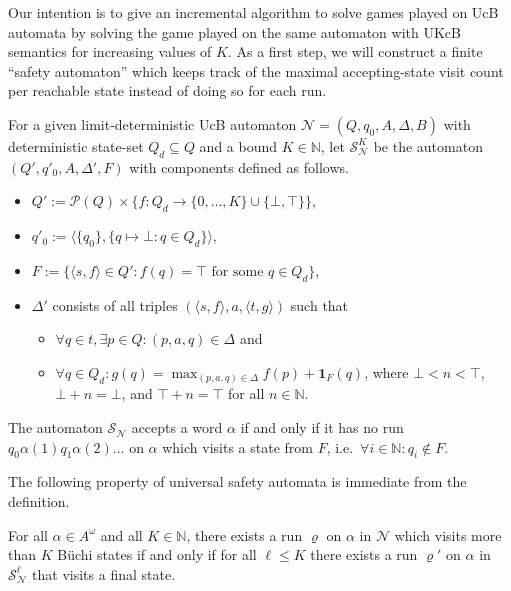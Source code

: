 \documentclass[runningheads,a4paper,draft]{llncs}
\let\rho\varrho
\newcommand{\indicator}[2]{\mathbf{1}_{#1}(#2)}
\newcommand{\pow}{\mathcal{P}}
\newcommand{\st}{\mathrel{:}}
\newcommand{\ie}{i.e.\xspace}
\newcommand{\calN}{\mathcal{N}}
\newcommand{\calS}{\mathcal{S}}
\begin{document}
Our intention is to give an incremental algorithm to solve games played on UcB
automata by solving the game played on the same automaton with UKcB semantics
for increasing values of $K$. As a first step, we will construct a finite
``safety automaton'' which keeps track of the maximal accepting-state visit
count per reachable state instead of doing so for each run.
\begin{definition}
    For a given limit-deterministic UcB automaton $\calN = (Q,q_0,A,\Delta,B)$
    with deterministic state-set $Q_d \subseteq Q$ and a bound $K \in
    \mathbb{N}$, let $\calS^K_\calN$ be the automaton $(Q',q'_0,A,\Delta',F)$ with
    components defined as follows.
    \begin{itemize}
        \item $Q' := \pow(Q) \times \{f : Q_d \to \{0,\dots,K\} \cup
            \{\bot,\top\}\}$,
        \item $q'_0 := \langle \{q_0\}, \{ q \mapsto \bot \st q \in Q_d\}
            \rangle$,
        \item $F := \{ \langle s, f \rangle \in Q' \st f(q) = \top \text{ for
            some } q \in Q_d \}$,
        \item $\Delta'$ consists of all triples 
            $(\langle s, f \rangle, a, \langle t, g \rangle)$ such that
            \begin{itemize}
                \item $\forall q \in t, \exists p \in Q : (p,a,q) \in \Delta$ and
                \item $\forall q \in Q_d :
                        g(q) = \max_{(p,a,q) \in \Delta}
                        f(p) + \indicator{F}{q}$,
                    where $\bot < n < \top$, $\bot + n = \bot$, and $\top + n =
                    \top$ for all $n \in \mathbb{N}$.
            \end{itemize}
    \end{itemize}
    The automaton $\calS_\calN$ accepts a word $\alpha$ if and only if it has no
    run $q_0 \alpha(1) q_1 \alpha(2) \dots$ on $\alpha$ which visits a
    state from $F$, \ie~$\forall i \in \mathbb{N} : q_i \not\in F$.
\end{definition}

The following property of universal safety automata is immediate from the
definition.
\begin{lemma}
    For all $\alpha \in A^\omega$ and all $K \in \mathbb{N}$, there exists a
    run $\rho$ on $\alpha$ in $\calN$ which visits more than $K$ B\"uchi states
    if and only if for all $\ell \le K$ there exists a run $\rho'$ on $\alpha$ in
    $\calS^\ell_\calN$ that visits a final state.
\end{lemma}
\end{document}
